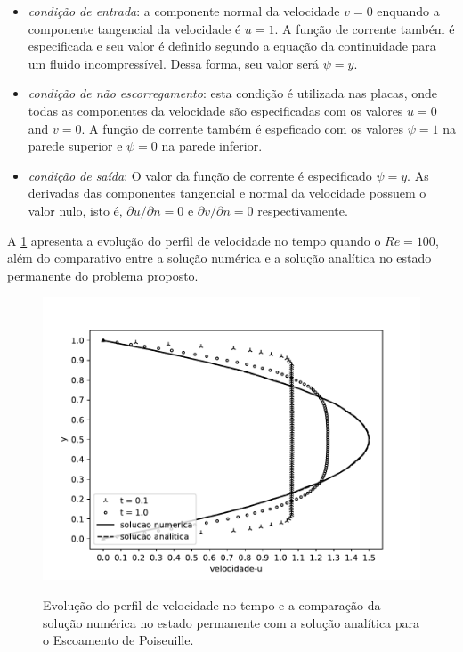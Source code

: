 \begin{itemize}
     \item \textit{condição de entrada}:
      a componente normal da velocidade $v=0$ enquando a componente tangencial da velocidade é $u = 1$. 
      A função de corrente também é especificada e seu valor é definido segundo a equação da continuidade 
      para um fluido incompressível. Dessa forma, seu valor será $\psi = y$.

     \item \textit{condição de não escorregamento}: esta condição é utilizada nas placas, 
      onde todas as componentes da velocidade são especificadas
      com os valores $u=0$ and $v=0$.
      A função de corrente também é espeficado com os valores $\psi=1$ na parede
      superior e $\psi=0$ na parede inferior.

     \item \textit{condição de saída}: O valor da função de corrente é especificado $\psi=y$. As derivadas das
     componentes tangencial e normal da velocidade possuem o 
     valor nulo, isto é,
      $\partial u/\partial n = 0$ e
      $\partial v/\partial n = 0$ respectivamente.
\end{itemize}


\medskip
A \ref{velocidade poiseuille} apresenta a evolução 
do perfil de velocidade no tempo quando o $Re=100$, além do comparativo
entre a solução numérica e a solução analítica no estado permanente do
problema proposto. 


\begin{figure}[H]
     \centering
     \includegraphics[scale=1]{./02_chaps/cap_validation/figure/poiseuille_velocity.pdf}\\
     \medskip
     \caption{Evolução do perfil de velocidade no tempo e
     a comparação da solução numérica no estado permanente com a solução analítica para o Escoamento de Poiseuille.}
     \label{velocidade poiseuille}
\end{figure}

